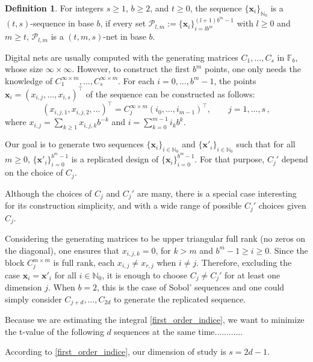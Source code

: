 \documentclass[]{elsarticle}
\theoremstyle{definition}
\newtheorem{defin}{Definition}
\newcommand{\bvec}[1]{\boldsymbol{#1}}
\newcommand{\vx}{\bvec{x}}
\begin{document}
\begin{defin}
For integers $s\geq 1$, $b\geq 2$, and $t\geq 0$, the sequence $\{\vx_i\}_{\mathbb{N}_0}$ is a $(t,s)$-sequence in base $b$, if every set $\mathcal{P}_{l,m}:=\{\vx_i\}_{i=lb^m}^{(l+1)b^m-1}$ with $l\geq 0$ and $m\geq t$, $\mathcal{P}_{l,m}$ is a $(t,m,s)$-net in base $b$.
\end{defin}

Digital nets are usually computed with the generating matrices $C_1,\dots,C_s$ in $\mathbb{F}_b$, whose size $\infty\times\infty$. However, to construct the first $b^m$ points, one only needs the knowledge of $C_1^{\infty\times m},\dots,C_s^{\infty\times m}$. For each $i=0,\dots,b^m-1$, the points $\vx_i = (x_{i,j},\dots,x_{i,s})^\intercal$ of the sequence can be constructed as follows:
\begin{equation}
(x_{i,j,1},x_{i,j,2},\dots)^\intercal = C_j^{\infty\times m}(i_{0},\dots,i_{m-1})^\intercal,\qquad j= 1,\dots,s\, ,
\end{equation}
where $x_{i,j} = \sum_{k \geq 1}x_{i,j,k}b^{-k}$ and $i = \sum_{k=0}^{m-1}i_kb^{k}$.

Our goal is to generate two sequences $\{\vx_i\}_{i\in\mathbb{N}_0}$ and $\{{\vx'}_i\}_{i\in\mathbb{N}_0}$ such that for all $m\geq 0$, $\{{\vx'}_i\}_{i=0}^{b^m-1}$ is a replicated design of $\{{\vx}_i\}_{i=0}^{b^m-1}$. For that purpose, $C_j'$ depend on the choice of $C_j$.

Although the choices of $C_j$ and $C_j'$ are many, there is a special case interesting for its construction simplicity, and with a wide range of possible $C_j'$ choices given $C_j$.

Considering the generating matrices to be upper triangular full rank (no zeros on the diagonal), one ensures that $x_{i,j,k}=0$, for $k>m$ and $b^m-1\geq i \geq 0$. Since the block $C_j^{m\times m}$ is full rank, each $x_{i,j}\neq x_{r,j}$ when $i\neq j$. Therefore, excluding the case ${\vx}_i={\vx'}_i$ for all $i\in\mathbb{N}_0$, it is enough to choose $C_j\neq C_j'$ for at least one dimension $j$. When $b=2$, this is the case of Sobol' sequences and one could simply consider $C_{j+d},\dots,C_{2d}$ to generate the replicated sequence.

Because we are estimating the integral \eqref{first_order_indice}, we want to minimize the t-value of the following $d$ sequences at the same time............



According to \eqref{first_order_indice}, our dimension of study is $s = 2d-1$.
\end{document}
